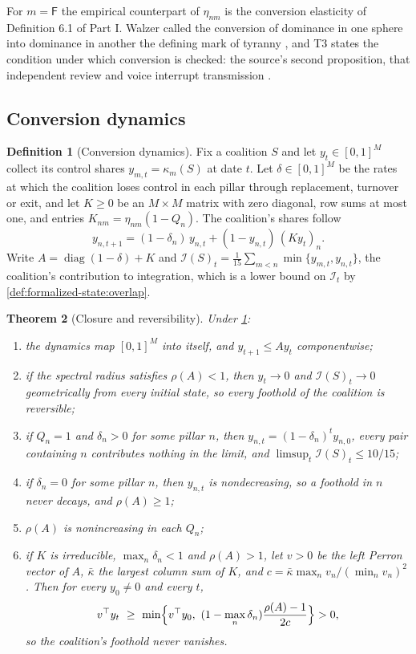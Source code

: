 \documentclass[11pt,letterpaper]{article}
\newtheorem{theorem}{Theorem}[section]
\theoremstyle{definition}
\newtheorem{definition}[theorem]{Definition}
\theoremstyle{remark}
\newcommand{\pF}{\mathsf{F}}
\newcommand{\Integ}{\mathcal{I}}
\begin{document}
For $m=\pF$ the empirical counterpart of $\eta_{nm}$ is the conversion elasticity of Definition 6.1 of Part I. Walzer called the conversion of dominance in one sphere into dominance in another the defining mark of tyranny \citep{walzer1983}, and T3 states the condition under which conversion is checked: the source's second proposition, that independent review and voice interrupt transmission \citep{largo2026hbs}.

\subsection{Conversion dynamics}

\begin{definition}[Conversion dynamics]
\label{def:formalized-state:conversion}
Fix a coalition $S$ and let $y_t\in[0,1]^M$ collect its control shares $y_{m,t}=\kappa_m(S)$ at date $t$. Let $\delta\in[0,1]^M$ be the rates at which the coalition loses control in each pillar through replacement, turnover or exit, and let $K\ge0$ be an $M\times M$ matrix with zero diagonal, row sums at most one, and entries $K_{nm}=\eta_{nm}(1-Q_n)$. The coalition's shares follow
\[
y_{n,t+1}=(1-\delta_n)\,y_{n,t}+(1-y_{n,t})\,(Ky_t)_n .
\]
Write $A=\operatorname{diag}(1-\delta)+K$ and $\Integ(S)_t=\frac{1}{15}\sum_{m<n}\min\{y_{m,t},y_{n,t}\}$, the coalition's contribution to integration, which is a lower bound on $\Integ_t$ by \cref{def:formalized-state:overlap}.
\end{definition}

\begin{theorem}[Closure and reversibility]
\label{thm:formalized-state:conversion}
Under \cref{def:formalized-state:conversion}:
\begin{enumerate}[label=(\alph*)]
\item the dynamics map $[0,1]^M$ into itself, and $y_{t+1}\le Ay_t$ componentwise;
\item if the spectral radius satisfies $\rho(A)<1$, then $y_t\to0$ and $\Integ(S)_t\to0$ geometrically from every initial state, so every foothold of the coalition is reversible;
\item if $Q_n=1$ and $\delta_n>0$ for some pillar $n$, then $y_{n,t}=(1-\delta_n)^ty_{n,0}$, every pair containing $n$ contributes nothing in the limit, and $\limsup_t\Integ(S)_t\le10/15$;
\item if $\delta_n=0$ for some pillar $n$, then $y_{n,t}$ is nondecreasing, so a foothold in $n$ never decays, and $\rho(A)\ge1$;
\item $\rho(A)$ is nonincreasing in each $Q_n$;
\item if $K$ is irreducible, $\max_n\delta_n<1$ and $\rho(A)>1$, let $v>0$ be the left Perron vector of $A$, $\bar\kappa$ the largest column sum of $K$, and $c=\bar\kappa\max_nv_n/(\min_nv_n)^2$. Then for every $y_0\neq0$ and every $t$,
\[
v^{\top}y_t\ \ge\ \min\Bigl\{v^{\top}y_0,\ (1-\max_n\delta_n)\frac{\rho(A)-1}{2c}\Bigr\}>0,
\]
so the coalition's foothold never vanishes.
\end{enumerate}
\end{theorem}
\end{document}
